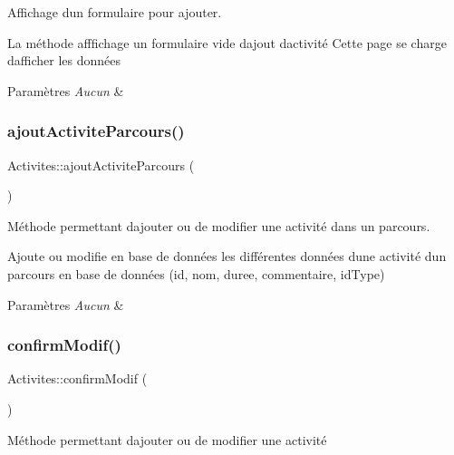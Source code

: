 Affichage d\textquotesingle{}un formulaire pour ajouter. 

La méthode afffichage un formulaire vide d\textquotesingle{}ajout d\textquotesingle{}activité Cette page se charge d\textquotesingle{}afficher les données 
\begin{DoxyParams}{Paramètres}
{\em Aucun} & \\
\hline
\end{DoxyParams}
\mbox{\label{class_activites_aab6de340e6a8da23b8573a70c4e9e1af}} 
\subsubsection{\texorpdfstring{ajout\+Activite\+Parcours()}{ajoutActiviteParcours()}}
{\footnotesize\ttfamily Activites\+::ajout\+Activite\+Parcours (\begin{DoxyParamCaption}{ }\end{DoxyParamCaption})}



Méthode permettant d\textquotesingle{}ajouter ou de modifier une activité dans un parcours. 

Ajoute ou modifie en base de données les différentes données d\textquotesingle{}une activité d\textquotesingle{}un parcours en base de données (id, nom, duree, commentaire, id\+Type) 
\begin{DoxyParams}{Paramètres}
{\em Aucun} & \\
\hline
\end{DoxyParams}
\mbox{\label{class_activites_a6e26781843a8973781d641d1d78ae277}} 
\subsubsection{\texorpdfstring{confirm\+Modif()}{confirmModif()}}
{\footnotesize\ttfamily Activites\+::confirm\+Modif (\begin{DoxyParamCaption}{ }\end{DoxyParamCaption})}



Méthode permettant d\textquotesingle{}ajouter ou de modifier une activité 

